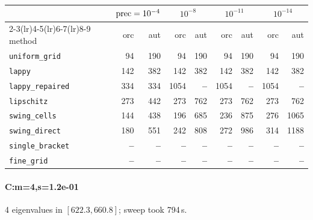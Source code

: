 \begin{center}
\small
\begin{tabular}{lrrrrrrrr}
\toprule
& \multicolumn{2}{c}{$\mathrm{prec}=10^{-4}$} & \multicolumn{2}{c}{$10^{-8}$} & \multicolumn{2}{c}{$10^{-11}$} & \multicolumn{2}{c}{$10^{-14}$} \\
\cmidrule(lr){2-3}\cmidrule(lr){4-5}\cmidrule(lr){6-7}\cmidrule(lr){8-9}
method & orc & aut & orc & aut & orc & aut & orc & aut \\
\midrule
\texttt{uniform\_grid} & 94 & 190 & 94 & 190 & 94 & 190 & 94 & 190 \\
\texttt{lappy} & 142 & 382 & 142 & 382 & 142 & 382 & 142 & 382 \\
\texttt{lappy\_repaired} & 334 & 334 & 1054 & \textbf{--} & 1054 & \textbf{--} & 1054 & \textbf{--} \\
\texttt{lipschitz} & 273 & 442 & 273 & 762 & 273 & 762 & 273 & 762 \\
\texttt{swing\_cells} & 144 & 438 & 196 & 685 & 236 & 875 & 276 & 1065 \\
\texttt{swing\_direct} & 180 & 551 & 242 & 808 & 272 & 986 & 314 & 1188 \\
\midrule
\texttt{single\_bracket} & \textbf{--} & \textbf{--} & \textbf{--} & \textbf{--} & \textbf{--} & \textbf{--} & \textbf{--} & \textbf{--} \\
\texttt{fine\_grid} & \textbf{--} & \textbf{--} & \textbf{--} & \textbf{--} & \textbf{--} & \textbf{--} & \textbf{--} & \textbf{--} \\
\bottomrule
\end{tabular}
\end{center}

\paragraph{C:m=4,s=1.2e-01} 4 eigenvalues in $[622.3, 660.8]$; sweep took 794\,s.

